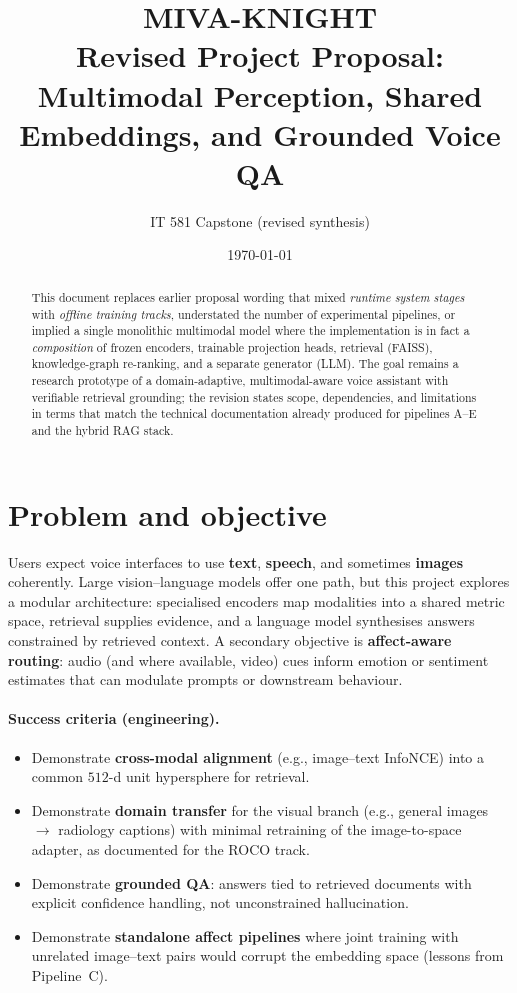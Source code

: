 \documentclass[12pt,a4paper]{article}
\title{\textbf{MIVA-KNIGHT}\\[0.35em]
\large Revised Project Proposal:\\
Multimodal Perception, Shared Embeddings, and Grounded Voice QA}
\author{IT 581 Capstone (revised synthesis)}
\date{\today}
\begin{document}
\maketitle

\begin{abstract}
This document replaces earlier proposal wording that mixed \emph{runtime system stages}
with \emph{offline training tracks}, understated the number of experimental pipelines,
or implied a single monolithic multimodal model where the implementation is in fact a
\emph{composition} of frozen encoders, trainable projection heads, retrieval (FAISS),
knowledge-graph re-ranking, and a separate generator (LLM). The goal remains a
research prototype of a domain-adaptive, multimodal-aware voice assistant with
verifiable retrieval grounding; the revision states scope, dependencies, and
limitations in terms that match the technical documentation already produced for
pipelines A--E and the hybrid RAG stack.
\end{abstract}

\section{Problem and objective}

Users expect voice interfaces to use \textbf{text}, \textbf{speech}, and sometimes
\textbf{images} coherently. Large vision--language models offer one path, but this
project explores a modular architecture: specialised encoders map modalities into a
shared metric space, retrieval supplies evidence, and a language model synthesises
answers constrained by retrieved context. A secondary objective is \textbf{affect-aware
routing}: audio (and where available, video) cues inform emotion or sentiment estimates
that can modulate prompts or downstream behaviour.

\paragraph{Success criteria (engineering).}
\begin{itemize}[nosep]
  \item Demonstrate \textbf{cross-modal alignment} (e.g., image--text InfoNCE) into a
        common $512$-d unit hypersphere for retrieval.
  \item Demonstrate \textbf{domain transfer} for the visual branch (e.g., general
        images $\to$ radiology captions) with minimal retraining of the image-to-space
        adapter, as documented for the ROCO track.
  \item Demonstrate \textbf{grounded QA}: answers tied to retrieved documents with
        explicit confidence handling, not unconstrained hallucination.
  \item Demonstrate \textbf{standalone affect pipelines} where joint training with
        unrelated image--text pairs would corrupt the embedding space (lessons from
        Pipeline~C).
\end{itemize}
\end{document}
